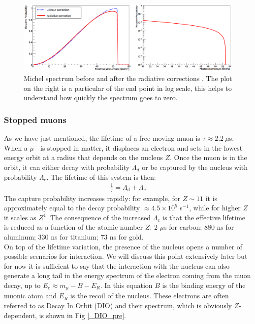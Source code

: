 \documentclass[12pt,a4paper,openright, oneside, titlepage]{book} %
\begin{document}
\begin{figure}[h!]
\centering
\includegraphics[scale=0.5]{Michel}
\caption{Michel spectrum before and after the radiative corrections \cite{signorelli}. The plot on the right is a particular of the end point in log scale, this helps to understand how quickly the spectrum goes to zero.}
\label{_Michel}
\end{figure}

\subsubsection{Stopped muons}
\label{stopped_muon}
As we have just mentioned, 
the lifetime of a free moving muon is $\tau\approx 2.2\ \mu$s. 
When a $\mu^-$ is stopped in matter, 
it displaces an electron and sets in the lowest energy orbit at a radius that depends on the nucleus $Z$. 
Once the muon is in the orbit, it can either decay with probability $\Lambda_d$ 
or be captured by the nucleus with probability $\Lambda_c$. 
The lifetime of this system is then:
\begin{align}
\frac{1}{\tau}=\Lambda_d + \Lambda_c \label{eq_tau}
\end{align}
The capture probability increases rapidly: 
for example, for $Z\sim 11$ it is approximately equal to the decay probability $\approx 4.5 \times 10^5$ s$^{-1}$,
 while for higher $Z$ it scales as $Z^4$.
The consequence of the increased $\Lambda_c$ is that the effective lifetime is reduced 
as a function of the atomic number $Z$: 2 $\mu$s for carbon; 
880 ns for aluminum; 
330 ns for titanium; 
73 ns for gold.\\
On top of the lifetime variation, 
the presence of the nucleus opens a number of possible scenarios for interaction. 
We will discuss this point extensively later but for now it is sufficient to say 
that the interaction with the nucleus can also generate a long tail in the energy spectrum 
of the electron coming from the muon decay, up to $E_e\approx m_\mu -B -E_R$. In this equation $B$ is the binding energy of the muonic atom and $E_R$ is the recoil of the nucleus. 
These electrons are often referred to as Decay In Orbit (DIO) and their spectrum, 
which is obviously $Z$-dependent, is shown in Fig \ref{_DIO_pre}.\\
\end{document}
